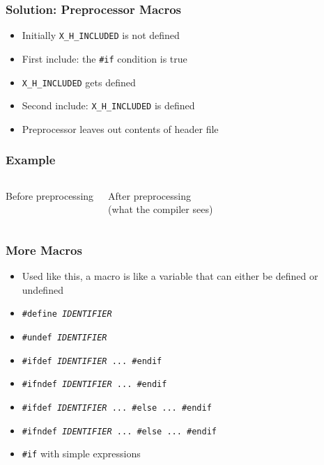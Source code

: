 \documentclass{../ucll-slides}
\begin{document}
\begin{frame}
  \frametitle{Solution: Preprocessor Macros}
  \begin{itemize}
    \item Initially {\tt X\_H\_INCLUDED} is not defined
    \item First include: the {\tt \#if} condition is true
    \item {\tt X\_H\_INCLUDED} gets defined
    \item Second include: {\tt X\_H\_INCLUDED} is defined
    \item Preprocessor leaves out contents of header file
  \end{itemize}
\end{frame}

\begin{frame}
  \frametitle{Example}
  \begin{columns}[t]
    \column{5cm}
    \begin{center} Before preprocessing \end{center}
    \column{5cm}
    \begin{center} After preprocessing \\ (what the compiler sees) \end{center}
    \vskip2cm
  \end{columns}
\end{frame}

\begin{frame}
  \frametitle{More Macros}
  \begin{itemize}
    \item Used like this, a macro is like a variable
          that can either be defined or undefined
    \item {\tt \#define {\it IDENTIFIER}}
    \item {\tt \#undef {\it IDENTIFIER}}
    \item {\tt \#ifdef {\it IDENTIFIER} ... \#endif}
    \item {\tt \#ifndef {\it IDENTIFIER} ... \#endif}
    \item {\tt \#ifdef {\it IDENTIFIER} ... \#else ... \#endif}
    \item {\tt \#ifndef {\it IDENTIFIER} ... \#else ... \#endif}
    \item {\tt \#if} with simple expressions
  \end{itemize}
\end{frame}
\end{document}
